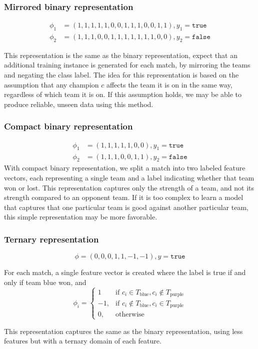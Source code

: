 \subsubsection{Mirrored binary representation}

\begin{align*}
  \phi_1 &= (1,1,1,1,1,0,0,1,1,1,0,0,1,1), y_1 = \texttt{true}\\
  \phi_2 &= (1,1,1,0,0,1,1,1,1,1,1,1,0,0), y_2 = \texttt{false}
\end{align*}

This representation is the same as the binary representation, expect that an additional training instance is generated for each match, by mirroring the teams and negating the class label.
The idea for this representation is based on the assumption that any champion $c$ affects the team it is on in the same way, regardless of which team it is on.
If this assumption holds, we may be able to produce reliable, unseen data using this method.

\subsubsection{Compact binary representation}
\begin{align*}
  \phi_1 &= (1,1,1,1,1,0,0), y_1 = \texttt{true} \\
  \phi_2 &= (1,1,1,0,0,1,1), y_2 =\texttt{false}
\end{align*}
With compact binary representation, we split a match into two labeled feature vectors, each representing a single team and a label indicating whether that team won or lost.
This representation captures only the strength of a team, and not its strength compared to an opponent team.
If it is too complex to learn a model that captures that one particular team is good against another particular team, this simple representation may be more favorable.

\subsubsection{Ternary representation}

\[\phi = (0,0,0,1,1,-1,-1), y = \texttt{true}\]

For each match, a single feature vector is created where the label is true if and only if team blue won, and
\[
    \phi_i = 
\begin{cases}
    1 				 & \text{if } c_i \in T_\text{blue}, c_i \not\in T_\text{purple}\\
    -1,              & \text{if } c_i \not\in T_\text{blue}, c_i \in T_\text{purple}\\
    0,              & \text{otherwise}
\end{cases}
\]

This representation captures the same as the binary representation, using less features but with a ternary domain of each feature.